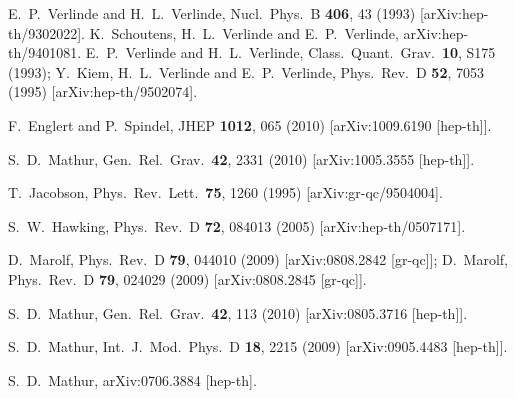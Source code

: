 \documentclass[12pt]{article}
\begin{document}
\begin{thebibliography}{10}
E.~P.~Verlinde and H.~L.~Verlinde,
  Nucl.\ Phys.\  B {\bf 406}, 43 (1993)
  [arXiv:hep-th/9302022].
K.~Schoutens, H.~L.~Verlinde and E.~P.~Verlinde,
  arXiv:hep-th/9401081.
  E.~P.~Verlinde and H.~L.~Verlinde,
  Class.\ Quant.\ Grav.\  {\bf 10}, S175 (1993);
Y.~Kiem, H.~L.~Verlinde and E.~P.~Verlinde,
  Phys.\ Rev.\  D {\bf 52}, 7053 (1995)
  [arXiv:hep-th/9502074].

        F.~Englert and P.~Spindel,
        JHEP {\bf 1012}, 065 (2010)
        [arXiv:1009.6190 [hep-th]].

  S.~D.~Mathur,
  Gen.\ Rel.\ Grav.\  {\bf 42}, 2331 (2010)
  [arXiv:1005.3555 [hep-th]].

  T.~Jacobson,
  Phys.\ Rev.\ Lett.\  {\bf 75}, 1260 (1995)
  [arXiv:gr-qc/9504004].



  S.~W.~Hawking,
  Phys.\ Rev.\  D {\bf 72}, 084013 (2005)
  [arXiv:hep-th/0507171].

D.~Marolf,
  Phys.\ Rev.\  D {\bf 79}, 044010 (2009)
  [arXiv:0808.2842 [gr-qc]];
 D.~Marolf,
  Phys.\ Rev.\  D {\bf 79}, 024029 (2009)
  [arXiv:0808.2845 [gr-qc]].

  S.~D.~Mathur,
  Gen.\ Rel.\ Grav.\  {\bf 42}, 113 (2010)
  [arXiv:0805.3716 [hep-th]].


  S.~D.~Mathur,
  Int.\ J.\ Mod.\ Phys.\  D {\bf 18}, 2215 (2009)
  [arXiv:0905.4483 [hep-th]].

  S.~D.~Mathur,
  arXiv:0706.3884 [hep-th].




  
\end{thebibliography}
\end{document}
